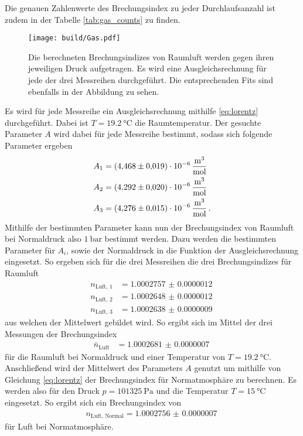 Die genauen Zahlenwerte des Brechungsindex zu jeder Durchlaufsanzahl ist zudem in der Tabelle \ref{tab:gas_counts} zu finden.
\begin{figure}
    \centering 
    \texttt{[image: build/Gas.pdf]}
    \caption{Die berechneten Brechungsindizes von Raumluft werden gegen ihren jeweiligen Druck aufgetragen.
    Es wird eine Ausgleichsrechnung für jede der drei Messreihen durchgeführt.
    Die entsprechenden Fits sind ebenfalls in der Abbildung zu sehen.}
    \label{fig:n_glass}
\end{figure}
Es wird für jede Messreihe ein Ausgleichsrechnung mithilfe \autoref{eq:lorentz} durchgeführt.
Dabei ist $T=\SI{19.2}{\celsius}$ die Raumtemperatur.
Der gesuchte Parameter $A$ wird dabei für jede Messreihe bestimmt, sodass sich folgende Parameter ergeben
\begin{align*}
    A_1 &= \SI{4.468(19)e-6}{\frac{\cubic\meter}{\mol}} \\
    A_2 &= \SI{4.292(20)e-6}{\frac{\cubic\meter}{\mol}} \\
    A_3 &= \SI{4.276(15)e-6}{\frac{\cubic\meter}{\mol}} \, .
\end{align*}
Mithilfe der bestimmten Parameter kann nun der Brechungsindex von Raumluft bei Normaldruck also $\SI{1}{\bar}$ bestimmt werden.
Dazu werden die bestimmten Parameter für $A_i$, sowie der Normaldruck in die Funktion der Ausgleichsrechnung eingesetzt.
So ergeben sich für die drei Messreihen die drei Brechungsindizes für Raumluft
\begin{align*}
    n_\text{Luft, 1} &= \SI{1.0002757(12)}{}\\
    n_\text{Luft, 2} &= \SI{1.0002648(12)}{}\\
    n_\text{Luft, 3} &= \SI{1.0002638(09)}{}
\end{align*}
aus welchen der Mittelwert gebildet wird.
So ergibt sich im Mittel der drei Messungen der Brechungsindex
\begin{align*}
    \bar{n}_\text{Luft} &= \SI{1.0002681(07)}{}
\end{align*}
für die Raumluft bei Normaldruck und einer Temperatur von $T=\SI{19.2}{\celsius}$.
Anschließend wird der Mittelwert des Parameters $A$ genutzt um mithilfe von Gleichung \eqref{eq:lorentz} der Brechungsindex für Normatmosphäre zu berechnen.
Es werden also für den Druck $p=\SI{101325}{\Pa}$ und die Temperatur $T=\SI{15}{\celsius}$ eingesetzt.
So ergibt sich ein Brechungsindex von 
\begin{align*}
    n_\text{Luft, Normal} = \SI{1.0002756(7)}{}
\end{align*}
für Luft bei Normatmosphäre.